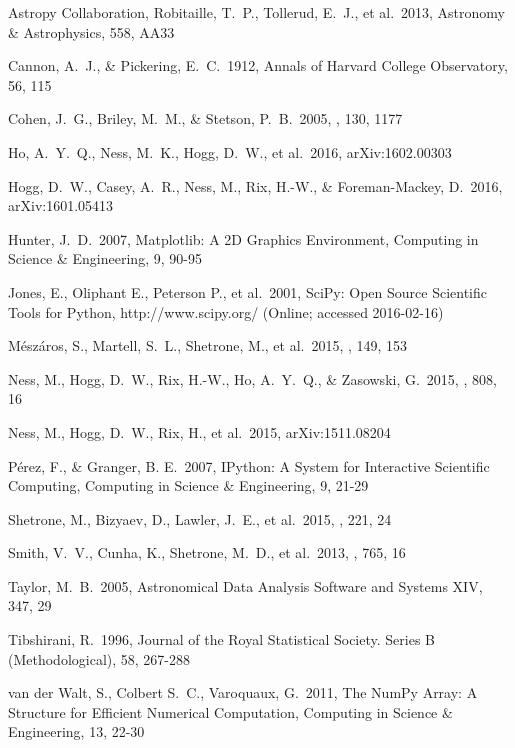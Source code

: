 \documentclass[12pt,preprint]{aastex}
\begin{document}
\begin{thebibliography}{dummy}\raggedright
{} Astropy Collaboration, Robitaille, T.~P., Tollerud, E.~J., et al.\ 2013, Astronomy \& Astrophysics, 558, AA33 

 Cannon, A.~J., \& Pickering, E.~C.\ 1912, Annals of Harvard College Observatory, 56, 115 

 Cohen, J.~G., Briley, 
M.~M., \& Stetson, P.~B.\ 2005, \aj, 130, 1177 

 Ho, A.~Y.~Q., Ness, M.~K., 
Hogg, D.~W., et al.\ 2016, arXiv:1602.00303 

 Hogg, D.~W., Casey, A.~R., 
Ness, M., Rix, H.-W., \& Foreman-Mackey, D.\ 2016, arXiv:1601.05413 

 Hunter, J.~D.\ 2007, Matplotlib: A 2D Graphics Environment, Computing in Science \& Engineering, 9, 90-95

 Jones, E., Oliphant E., Peterson P., et al.\ 2001, SciPy: Open Source Scientific Tools for Python, http://www.scipy.org/ (Online; accessed 2016-02-16)

M{\'e}sz{\'a}ros, S., Martell, S.~L., Shetrone, M., et al.\ 2015, \aj, 149, 
153 

 Ness, M., Hogg, D.~W., 
Rix, H.-W., Ho, A.~Y.~Q., \& Zasowski, G.\ 2015, \apj, 808, 16

 Ness, M., Hogg, D.~W., 
Rix, H., et al.\ 2015, arXiv:1511.08204 

 P\'erez, F., \& Granger, B. E.\ 2007, IPython: A System for Interactive Scientific Computing, Computing in Science \& Engineering, 9, 21-29

 Shetrone, M., Bizyaev, 
D., Lawler, J.~E., et al.\ 2015, \apjs, 221, 24 

 Smith, V.~V., Cunha, K., 
Shetrone, M.~D., et al.\ 2013, \apj, 765, 16 

 Taylor, M.~B.\ 2005, Astronomical Data Analysis Software and Systems XIV, 347, 29 

 Tibshirani, R.\ 1996, Journal of the Royal Statistical Society. Series B (Methodological), 58, 267-288

 van der Walt, S., Colbert S.~C., Varoquaux, G.\ 2011, The NumPy Array: A Structure for Efficient Numerical Computation, Computing in Science \& Engineering, 13, 22-30


\end{thebibliography}
\end{document}
